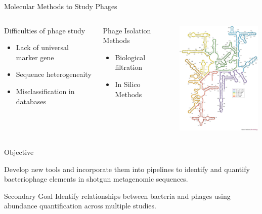 \documentclass[11pt]{beamer}
\begin{document}
	
	\begin{frame}{Molecular Methods to Study Phages}
	\begin{columns}
	\begin{block}{Difficulties of phage study}
	\begin{itemize}
		\item Lack of universal marker gene
		\item Sequence heterogeneaity 
		\item Misclassification in databases
	\end{itemize}
	\end{block}
		
		
	\begin{block}{Phage Isolation Methods}
	\begin{itemize}
		\item Biological filtration
		\item In Silico Methods
	\end{itemize}
	\end{block}
	
	\includegraphics[height=5.5cm, width=5cm]{ribosome.jpg}
	\end{columns}
		
	
	\end{frame}

	
	\begin{frame}{Objective}
	
	Develop new tools and incorporate them into pipelines to identify and quantify bacteriophage elements in shotgun metagenomic sequences.
	
	\begin{block}{Secondary Goal}
	Identify relationships between bacteria and phages using abundance quantification across multiple studies. 
	\end{block}
	\end{frame}
\end{document}
